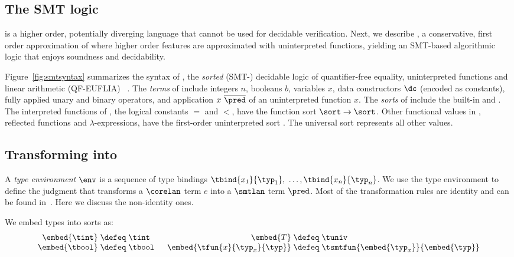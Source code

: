\subsection{The SMT logic \smtlan}
\corelan is a higher order, potentially diverging language
that cannot be used for decidable verification.
%
Next, we describe \smtlan, a conservative, first order
approximation of \corelan where higher order features are
approximated with uninterpreted functions, yielding an
SMT-based algorithmic logic that enjoys soundness
and decidability.


%
Figure~\ref{fig:smtsyntax} summarizes the syntax
of \smtlan, the \emph{sorted} (SMT-)
decidable logic of quantifier-free equality,
uninterpreted functions and linear
arithmetic (QF-EUFLIA) ~\citep{Nelson81,SMTLIB2}.
%
The \emph{terms} of \smtlan include
integers $n$,
booleans $b$,
variables $x$,
data constructors $\dc$ (encoded as constants),
fully applied unary \unop and binary \binop operators,
and application $x\ \overline{\pred}$ of an uninterpreted function $x$.
%
The \emph{sorts} of \smtlan include the built-in
\tint and \tbool.
%
The interpreted functions of \smtlan, \eg
the logical constants $=$ and $<$,
have the function sort $\sort \rightarrow \sort$.
%
Other functional values in \corelan, \eg
reflected \corelan functions and
$\lambda$-expressions, have the first-order
uninterpreted sort \tsmtfun{\sort}{\sort}.
%
The universal sort \tuniv represents all other values.

\subsection{Transforming \corelan into \smtlan}
%
\label{subsec:embedding}

%
%
A \emph{type environment} $\env$ is a sequence of type bindings
$\tbind{x_1}{\typ_1},$ $\ldots,\tbind{x_n}{\typ_n}$.
We use the type environment to define the judgment
that transforms a $\corelan$ term $e$
into a $\smtlan$ term $\pred$.
%
Most of the transformation rules are identity
and can be found in~\cite{appendix}.
Here we discuss the non-identity ones.

%
We embed \corelan types into \smtlan sorts as:
%
\[\arraycolsep=1.4pt
\begin{array}{rclcrcl}
\embed{\tint}                       & \defeq &  \tint & \quad &
\embed{T}                           & \defeq &  \tuniv \\
\embed{\tbool}                      & \defeq &  \tbool & \quad &
\embed{\tfun{x}{\typ_x}{\typ}} & \defeq & \tsmtfun{\embed{\typ_x}}{\embed{\typ}}
\end{array}
\]


